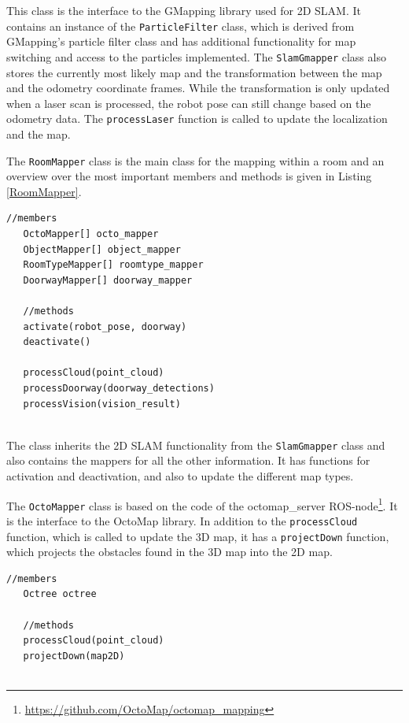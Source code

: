 This class is the interface to the GMapping library used for 2D SLAM. It contains an instance of the \texttt{ParticleFilter} class, which is derived from GMapping's particle filter class and has additional functionality for map switching and access to the particles implemented. The \texttt{SlamGmapper} class also stores the currently most likely map and the transformation between the map and the odometry coordinate frames. While the transformation is only updated when a laser scan is processed, the robot pose can still change based on the odometry data. The \texttt{processLaser} function is called to update the localization and the map.

The \texttt{RoomMapper} class is the main class for the mapping within a room and an overview over the most important members and methods is given in Listing \ref{RoomMapper}. 

\begin{minipage}{\linewidth}
\begin{lstlisting}[caption=\texttt{RoomMapper} class,frame=single, label=RoomMapper]
   //members
   OctoMapper[] octo_mapper
   ObjectMapper[] object_mapper
   RoomTypeMapper[] roomtype_mapper
   DoorwayMapper[] doorway_mapper
   
   //methods
   activate(robot_pose, doorway)
   deactivate()
   
   processCloud(point_cloud)
   processDoorway(doorway_detections)
   processVision(vision_result)
   
\end{lstlisting}
\end{minipage} 

The class inherits the 2D SLAM functionality from the \texttt{SlamGmapper} class and also contains the mappers for all the other information. It has functions for activation and deactivation, and also to update the different map types.

The \texttt{OctoMapper} class is based on the code of the octomap{\_}server ROS-node\footnote{\url{https://github.com/OctoMap/octomap_mapping}}. It is the interface to the OctoMap library. In addition to the \texttt{processCloud} function, which is called to update the 3D map, it has a \texttt{projectDown} function, which projects the obstacles found in the 3D map into the 2D map.

\begin{minipage}{\linewidth}
\begin{lstlisting}[caption=\texttt{OctoMapper} class,frame=single, label=OctoMapper]
   //members
   Octree octree
      
   //methods   
   processCloud(point_cloud)  
   projectDown(map2D)
   
\end{lstlisting}
\end{minipage} 

